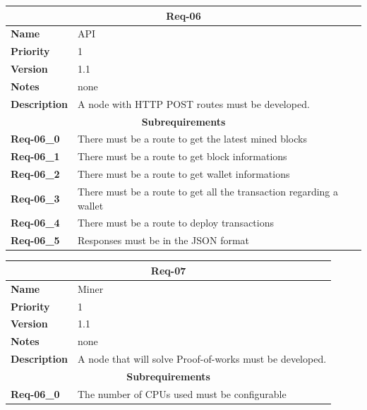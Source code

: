 \documentclass[../documentation.tex]{subfiles}
\begin{document}
\bgroup{}
\def\arraystretch{1.25}
\begin{center}
    \begin{tabular}{ |l|p{9cm}| }
        \hline
        \multicolumn{2}{|c|}{\textbf{Req-06}} \\
        \hline
        \textbf{Name} & API \\
        \hline
        \textbf{Priority} & 1 \\
        \hline
        \textbf{Version} & 1.1 \\
        \hline
        \textbf{Notes} & none \\
        \hline
        \textbf{Description} & A node with HTTP POST routes must be developed. \\
        \hline
        \multicolumn{2}{|c|}{\textbf{Subrequirements}} \\
        \hline
        \textbf{Req-06\_0} & There must be a route to get the latest mined blocks \\
        \hline
        \textbf{Req-06\_1} & There must be a route to get block informations \\
        \hline
        \textbf{Req-06\_2} & There must be a route to get wallet informations \\
        \hline
        \textbf{Req-06\_3} & There must be a route to get all the transaction regarding a wallet \\
        \hline
        \textbf{Req-06\_4} & There must be a route to deploy transactions \\
        \hline
        \textbf{Req-06\_5} & Responses must be in the JSON format \\
        \hline
    \end{tabular}
\end{center}
\egroup{}

\bgroup{}
\def\arraystretch{1.25}
\begin{center}
    \begin{tabular}{ |l|p{9cm}| }
        \hline
        \multicolumn{2}{|c|}{\textbf{Req-07}} \\
        \hline
        \textbf{Name} & Miner \\
        \hline
        \textbf{Priority} & 1 \\
        \hline
        \textbf{Version} & 1.1 \\
        \hline
        \textbf{Notes} & none \\
        \hline
        \textbf{Description} & A node that will solve Proof-of-works must be developed. \\
        \hline
        \multicolumn{2}{|c|}{\textbf{Subrequirements}} \\
        \hline
        \textbf{Req-06\_0} & The number of CPUs used must be configurable \\
        \hline
    \end{tabular}
\end{center}
\egroup{}
\end{document}
